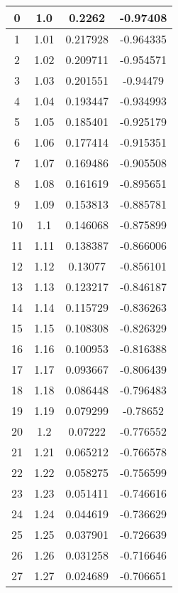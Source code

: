 \begin{table}
	\begin{center}
		\begin{tabular}{c|c|c|c}
			0 & 1.0 & 0.2262 & -0.97408 \\
			\hline
			1 & 1.01 & 0.217928 & -0.964335 \\
			\hline
			2 & 1.02 & 0.209711 & -0.954571 \\
			\hline
			3 & 1.03 & 0.201551 & -0.94479 \\
			\hline
			4 & 1.04 & 0.193447 & -0.934993 \\
			\hline
			5 & 1.05 & 0.185401 & -0.925179 \\
			\hline
			6 & 1.06 & 0.177414 & -0.915351 \\
			\hline
			7 & 1.07 & 0.169486 & -0.905508 \\
			\hline
			8 & 1.08 & 0.161619 & -0.895651 \\
			\hline
			9 & 1.09 & 0.153813 & -0.885781 \\
			\hline
			10 & 1.1 & 0.146068 & -0.875899 \\
			\hline
			11 & 1.11 & 0.138387 & -0.866006 \\
			\hline
			12 & 1.12 & 0.13077 & -0.856101 \\
			\hline
			13 & 1.13 & 0.123217 & -0.846187 \\
			\hline
			14 & 1.14 & 0.115729 & -0.836263 \\
			\hline
			15 & 1.15 & 0.108308 & -0.826329 \\
			\hline
			16 & 1.16 & 0.100953 & -0.816388 \\
			\hline
			17 & 1.17 & 0.093667 & -0.806439 \\
			\hline
			18 & 1.18 & 0.086448 & -0.796483 \\
			\hline
			19 & 1.19 & 0.079299 & -0.78652 \\
			\hline
			20 & 1.2 & 0.07222 & -0.776552 \\
			\hline
			21 & 1.21 & 0.065212 & -0.766578 \\
			\hline
			22 & 1.22 & 0.058275 & -0.756599 \\
			\hline
			23 & 1.23 & 0.051411 & -0.746616 \\
			\hline
			24 & 1.24 & 0.044619 & -0.736629 \\
			\hline
			25 & 1.25 & 0.037901 & -0.726639 \\
			\hline
			26 & 1.26 & 0.031258 & -0.716646 \\
			\hline
			27 & 1.27 & 0.024689 & -0.706651 \\

\end{tabular}
\end{center}
\end{table}
